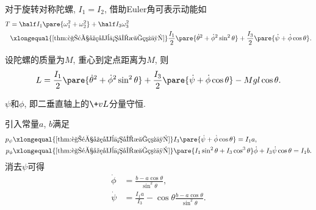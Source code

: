 \documentclass[../TheoreticalMechanics.tex]{subfiles}
\begin{document}
\begin{lemma}[Euler角表示动能]
    \label{lem:Euler角表示动能}
    对于旋转对称陀螺, $I_1=I_2$, 借助Euler角可表示动能如
    \begin{align*}
        T &= \half I_1\pare{\omega_1^2 + \omega_2^2} + \half I_3\omega_3^2 \\
        &\xlongequal{\text{\cref{thm:角速度在体坐标系下}}} \frac{I_1}{2}\pare{\dot{\theta}^2 + \dot{\phi}^2\sin^2\theta} + \frac{I_3}{2}\pare{\dot{\psi}+\dot{\phi}\cos\theta}.
    \end{align*}
\end{lemma}
\begin{finale}
    \begin{theorem}[定点陀螺的Lagrange量]
        设陀螺的质量为$M$, 重心到定点距离为$M$, 则
        \[ L = \frac{I_1}{2}\pare{\dot{\theta}^2 + \dot{\phi}^2\sin^2\theta} + \frac{I_3}{2}\pare{\dot{\psi}+\dot{\phi}\cos\theta} - Mgl\cos\theta. \]
    \end{theorem}
\end{finale}
\begin{corollary}[角动量分量守恒]
    \label{coll:角动量分量守恒}
    $\psi$和$\phi$, 即二垂直轴上的$\+vL$分量守恒.
\end{corollary}
\begin{theorem}[进动对章动关系]
    \label{thm:进动对章动关系}
    引入常量$a$, $b$满足
    \begin{align*}
        p_\psi &\xlongequal{\text{\cref{thm:角速度在体坐标系下}}} I_3\pare{\dot{\psi}+\dot{\phi}\cos\theta} = I_1a, \\
        p_\phi &\xlongequal{\text{\cref{thm:角速度在体坐标系下}}} \pare{I_1\sin^2\theta + I_3\cos^3\theta}\dot{\phi} + I_3\dot{\psi}\cos\theta = I_1 b.
    \end{align*}
    消去$\psi$可得
    \begin{align*}
        \dot{\phi} &= \frac{b - a\cos\theta}{\sin^2\theta},\\
        \dot{\psi} &= \frac{I_1a}{I_3} - \cos\theta\frac{b - a\cos\theta}{\sin^2\theta}.
    \end{align*}
\end{theorem}
\end{document}
